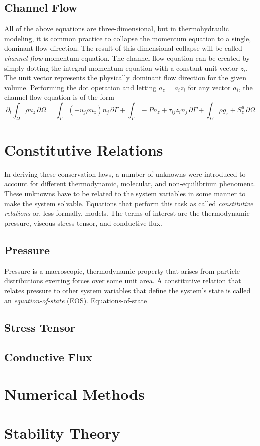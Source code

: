\documentclass[Prelim,12pt]{WisconsinThesis}
\newcommand{\pdt}   {\partial_t}
\newcommand{\V}     {\ensuremath{\Omega}}
\newcommand{\dV}    {\,\partial\V}
\newcommand{\IntV}  {\int_{\V}}
\renewcommand{\S}   {\ensuremath{\Gamma}}
\newcommand{\dS}    {\,\partial\S}
\newcommand{\IntS}  {\int_{\S}}
\begin{document}
\subsection{Channel Flow}
All of the above equations are three-dimensional, but in thermohydraulic modeling, it is common practice to collapse the momentum equation to a single, dominant flow direction.
The result of this dimensional collapse will be called \textit{channel flow} momentum equation.
The channel flow equation can be created by simply dotting the integral momentum equation with a constant unit vector $z_i$.
The unit vector represents the physically dominant flow direction for the given volume.
Performing the dot operation and letting $a_z = a_i z_i$ for any vector $a_i$, the channel flow equation is of the form
\begin{equation}
    \pdt \IntV \rho u_z \dV = \IntS (-u_j \rho u_z) n_j \dS + \IntS - P n_z + \tau_{ij} z_i n_j \dS + \IntV \rho g_z + S^u_z \dV
\end{equation}








\section{Constitutive Relations}
In deriving these conservation laws, a number of unknowns were introduced to account for different thermodynamic, molecular, and non-equilibrium phenomena.
These unknowns have to be related to the system variables in some manner to make the system solvable.
Equations that perform this task as called \textit{constitutive relations} or, less formally, models.
The terms of interest are the thermodynamic pressure, viscous stress tensor, and conductive flux.

\subsection{Pressure}
Pressure is a macroscopic, thermodynamic property that arises from particle distributions exerting forces over some unit area.
A constitutive relation that relates pressure to other system variables that define the system's state is called an \textit{equation-of-state} (EOS).
Equations-of-state 

\subsection{Stress Tensor}

\subsection{Conductive Flux}





\section{Numerical Methods}
\section{Stability Theory}
\end{document}
